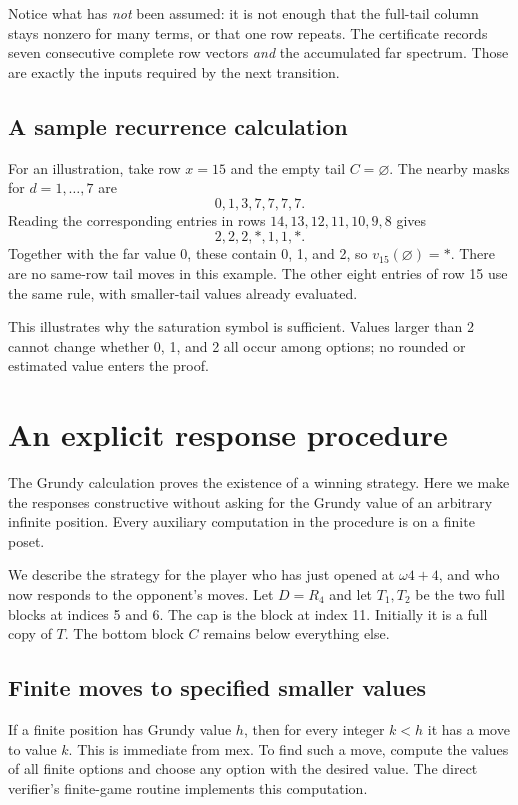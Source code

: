 \documentclass[11pt,letterpaper]{article}
\numberwithin{equation}{section}
\theoremstyle{definition}
\theoremstyle{remark}
\newcommand{\sat}{\ast}
\begin{document}
Notice what has \emph{not} been assumed: it is not enough that the
full-tail column stays nonzero for many terms, or that one row
repeats. The certificate records seven consecutive complete row
vectors \emph{and} the accumulated far spectrum. Those are exactly
the inputs required by the next transition.

\subsection{A sample recurrence calculation}

For an illustration, take row $x=15$ and the empty tail $C=\varnothing$.
The nearby masks for $d=1,\ldots,7$ are
\[
 0,1,3,7,7,7,7.
\]
Reading the corresponding entries in rows $14,13,12,11,10,9,8$
gives
\[
 2,2,2,\sat,1,1,\sat.
\]
Together with the far value 0, these contain 0, 1, and 2, so
$v_{15}(\varnothing)=\sat$. There are no same-row tail moves in
this example. The other eight entries of row 15 use the same rule,
with smaller-tail values already evaluated.

This illustrates why the saturation symbol is sufficient. Values
larger than 2 cannot change whether 0, 1, and 2 all occur among
options; no rounded or estimated value enters the proof.

\section{An explicit response procedure}\label{sec:strategy}

The Grundy calculation proves the existence of a winning strategy.
Here we make the responses constructive without asking for the
Grundy value of an arbitrary infinite position. Every auxiliary
computation in the procedure is on a finite poset.

We describe the strategy for the player who has just opened at
$\omega4+4$, and who now responds to the opponent's moves. Let
$D=R_4$ and let $T_1,T_2$ be the two full blocks at indices 5 and 6.
The cap is the block at index 11. Initially it is a full copy of $T$.
The bottom block $C$ remains below everything else.

\subsection{Finite moves to specified smaller values}

If a finite position has Grundy value $h$, then for every integer
$k<h$ it has a move to value $k$. This is immediate from mex.
To find such a move, compute the values of all finite options and
choose any option with the desired value. The direct verifier's
finite-game routine implements this computation.
\end{document}

